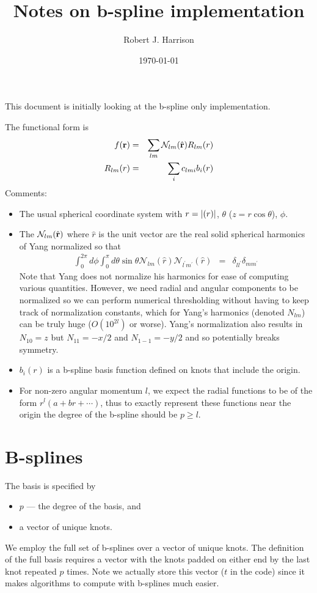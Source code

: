 \documentclass[12pt]{article}
\title{Notes on b-spline implementation}
\date{\today}
\author{Robert J. Harrison}
\newcommand{\N}{\mathcal{N}}
\begin{document}
\maketitle

This document is initially looking at the b-spline only implementation. 

The functional form is
\begin{eqnarray}
  f(\vb{r}) & = & \sum_{l m} \N_{lm}(\hat{\vb{r}}) R_{lm}(r) \\
  R_{lm}(r) & = & \sum_i c_{lmi} b_i(r)
\end{eqnarray}
Comments:
\begin{itemize}
\item The usual spherical coordinate system with $r = |\vb(r)|$, $\theta$ ($z=r \cos \theta$), $\phi$.
\item The $\N_{lm}(\hat{\vb{r}})$ where $\hat{r}$ is the unit vector are the real solid spherical harmonics of Yang normalized so that
\begin{eqnarray}
  \int_0^{2 \pi} d\phi \int_0^\pi d\theta \sin \theta  \N_{lm} (\hat{r}) \N_{l^\prime m^\prime}(\hat{r})  & = & \delta_{l l^\prime} \delta_{m m^\prime}
\end{eqnarray}
Note that Yang does not normalize his harmonics for ease of computing various quantities.  However, we need radial and angular components to be normalized so we can perform numerical thresholding without having to keep track of normalization constants, which for Yang's harmonics (denoted $N_{lm}$)  can be truly huge ($O(10^{2l})$ or worse).  Yang's normalization also results in $N_{10}=z$ but $N_{11}=-x/2$ and $N_{1-1}=-y/2$ and so potentially breaks symmetry.  
\item $b_i(r)$ is a b-spline basis function defined on knots that include the origin. 
\item For non-zero angular momentum $l$, we expect the radial functions to be of the form $r^l (a + b r + \cdots)$, thus to exactly represent these functions near the origin the degree of the b-spline should be $p \ge l$.
\end{itemize}

\section{B-splines}

The basis is specified by 
\begin{itemize}
\item $p$ --- the degree of the basis, and
\item a vector of unique knots.
\end{itemize}
We employ the full set of b-splines over a vector of unique knots.  The definition of the full basis requires a vector with the knots padded on either end by the last knot repeated $p$ times.  Note we actually store this vector ($t$ in the code) since it makes algorithms to compute with b-splines much easier. 
\end{document}
